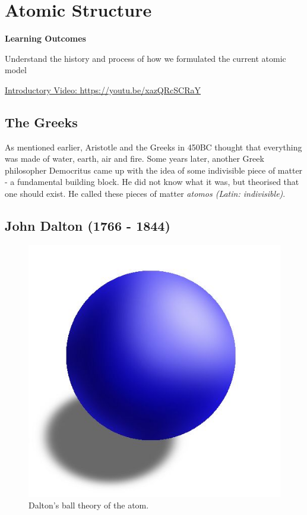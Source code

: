 \documentclass[12pt]{report}
\begin{document}
\newpage
\chapter{Atomic Structure}

\noindent\textbf{Learning Outcomes}
\begin{nwa}
	\item Understand the history and process of how we formulated the current atomic model
\end{nwa}

\noindent\href{https://youtu.be/xazQRcSCRaY}{Introductory Video: https://youtu.be/xazQRcSCRaY}

\section{The Greeks}
As mentioned earlier, Aristotle and the Greeks in 450BC thought that everything was made of water, earth, air and fire. Some years later, another Greek philosopher Democritus came up with the idea of some indivisible piece of matter - a fundamental building block. He did not know what it was, but theorised that one should exist. He called these pieces of matter \textit{atomos (Latin: indivisible)}.

\section{John Dalton (1766 - 1844)}

\begin{figure}
	\vspace{-1cm}
	\begin{center}
		\includegraphics[width=0.9\linewidth]{dalton-model.jpg}
		\caption{Dalton's ball theory of the atom.}
	\end{center}
\end{figure}
\end{document}
